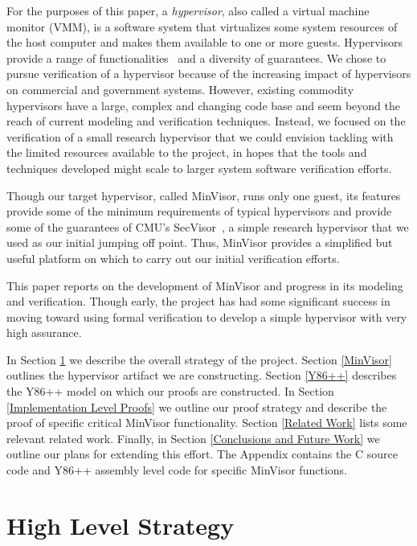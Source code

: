 \documentclass[submission,copyright]{eptcs} \providecommand{\event}{ACL2 2011}
\begin{document}
For the purposes of this paper, a \textit{hypervisor}, also called a
virtual machine monitor (VMM), is a software system that virtualizes
some system resources of the host computer and makes them available to
one or more guests.  Hypervisors provide a range of
functionalities~\cite{SmithNair} and a diversity of guarantees.
We chose to pursue verification of a hypervisor because of the
increasing impact of hypervisors on commercial and government systems.
However, existing commodity hypervisors have a large, complex and
changing code base and seem beyond the reach of current modeling and
verification techniques.  Instead, we focused on the verification of a
small research hypervisor that we could envision tackling with the
limited resources available to the project, in hopes that the tools
and techniques developed might scale to larger system software
verification efforts.  

Though our target hypervisor, called MinVisor, runs only one guest, its
features provide some of the minimum requirements of typical
hypervisors and provide some of the guarantees of CMU's
SecVisor~\cite{SecVisor}, a simple research hypervisor that we used as
our initial jumping off point.  Thus, MinVisor provides a simplified
but useful platform on which to carry out our initial verification
efforts.

This paper reports on the development of MinVisor and progress
in its modeling and verification.  Though early, the project has had
some significant success in moving toward using formal verification to
develop a simple hypervisor with very high assurance. 

In Section \ref{High Level Motivation} we describe the overall
strategy of the project.  Section \ref{MinVisor} outlines the
hypervisor artifact we are constructing.  Section \ref{Y86++}
describes the Y86++ model on which our proofs are constructed.  In
Section \ref{Implementation Level Proofs} we outline our proof
strategy and describe the proof of specific critical MinVisor
functionality.  Section \ref{Related Work} lists some relevant related
work.  Finally, in Section \ref{Conclusions and Future Work} we
outline our plans for extending this effort.  The Appendix contains
the C source code and Y86++ assembly level code for specific MinVisor
functions.


\section{High Level Strategy}
\label{High Level Motivation}
\end{document}
